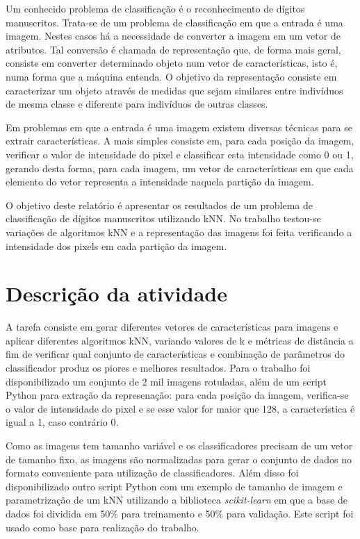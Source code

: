 \documentclass[
	12pt,				%
	openright,			%
	twoside,			%
	a4paper,			%
	english,			%
	brazil,				%
	svgnames
	]{abntex2}\usepackage[]{graphicx}\usepackage[]{color}
\begin{document}
Um conhecido problema de classificação é o reconhecimento de dígitos manuscritos. Trata-se de um problema de classificação em que a entrada é uma imagem. Nestes casos há a necessidade de converter a imagem em um vetor de atributos. Tal conversão é chamada de representação que, de forma mais geral, consiste em converter determinado objeto num vetor de características, isto é, numa forma que a máquina entenda. O objetivo da representação consiste em caracterizar um objeto através de medidas que sejam similares entre indivíduos de mesma classe e diferente para indivíduos de outras classes. 

Em problemas em que a entrada é uma imagem existem diversas técnicas para se extrair características. A mais simples consiste em, para cada posição da imagem, verificar o valor de intensidade do pixel e classificar esta intensidade como 0 ou 1, gerando desta forma, para cada imagem, um vetor de características em que cada elemento do vetor representa a intensidade naquela partição da imagem.

O objetivo deste relatório é apresentar os resultados de um problema de classificação de dígitos manuscritos utilizando kNN. No trabalho testou-se variações de algoritmos kNN e a representação das imagens foi feita verificando a intensidade dos pixels em cada partição da imagem.

\chapter{Descrição da atividade}
\label{cap:descricao}


A tarefa consiste em gerar diferentes vetores de características para imagens e aplicar diferentes algoritmos kNN, variando valores de k e métricas de distância a fim de verificar qual conjunto de características e combinação de parâmetros do classificador produz os piores e melhores resultados. Para o trabalho foi disponibilizado um conjunto de 2 mil imagens rotuladas, além de um script Python para extração da represenação: para cada posição da imagem, verifica-se o valor de intensidade do pixel e se esse valor for maior que 128, a característica é igual a 1, caso contrário 0. 

Como as imagens tem tamanho variável e os classificadores precisam de um vetor de tamanho fixo, as imagens são normalizadas para gerar o conjunto de dados no formato conveniente para utilização de classificadores. Além disso foi disponibilizado outro script Python com um exemplo de tamanho de imagem e parametrização de um kNN utilizando a biblioteca \emph{scikit-learn} em que a base de dados foi dividida em 50\% para treinamento e 50\% para validação. Este script foi usado como base para realização do trabalho.
\end{document}
